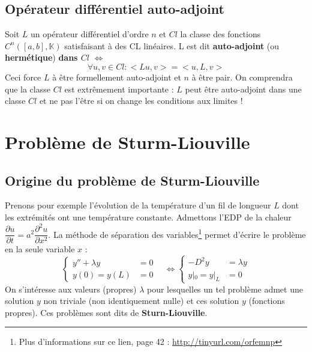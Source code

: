 \documentclass	[11pt, a4paper, openany]{book}
\begin{document}
			\subsection{Opérateur différentiel auto-adjoint}
			Soit $L$ un opérateur différentiel d'ordre $n$ et $Cl$ la classe des fonctions $C^n([a,b],\mathbb{K})$ satisfaisant à des CL linéaires. L est dit \textbf{auto-adjoint} (ou \textbf{hermétique}) \textbf{dans $Cl$} $\Leftrightarrow$
			\begin{equation}
				\forall u,v \in Cl : <Lu,v> = <u,L,v>
			\end{equation}
			Ceci force $L$ à être formellement auto-adjoint et $n$ à être pair.  On comprendra que la classe $Cl$ est extrêmement importante : $L$ peut être auto-adjoint dans une classe $Cl$ et ne pas l'être si on change les conditions aux limites !
			
			
			\newpage
			\section{Problème de Sturm-Liouville}
			\subsection{Origine du problème de Sturm-Liouville}
			Prenons pour exemple l'évolution de la température d'un fil de longueur $L$ dont les extrémités ont une température constante. Admettons l'EDP de la chaleur $\dfrac{\partial u}{\partial t} = a^2\dfrac{\partial^2u}{\partial x^2}$. La méthode de séparation des variables\footnote{Plus d'informations sur ce lien, page 42 : \url{http://tinyurl.com/orfemnp}} permet d'écrire le problème en la seule variable $x$ : 
			\begin{equation}
				\left\{\begin{array}{ll}
				y''+\lambda y &=0\\
				y(0)=y(L) &=0
				\end{array}\right.\ \ \ \ \Leftrightarrow
				\left\{\begin{array}{ll}
				-D^2y &= \lambda y\\
				y|_0 = y|_L &= 0
				\end{array}\right.
			\end{equation}
			On s'intéresse aux valeurs (propres) $\lambda$ pour lesquelles un tel problème admet une solution $y$ non triviale (non identiquement nulle) et ces solution $y$ (fonctions propres). Ces problèmes sont dits de \textbf{Sturn-Liouville}.
			
			
\end{document}
